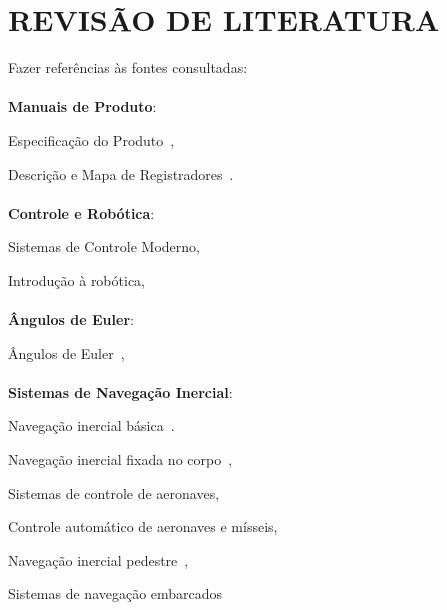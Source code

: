 \chapter{REVISÃO DE LITERATURA}\label{chap:fundamentacaoTeorica}

Fazer referências às fontes consultadas:
\\

\\
\textbf{Manuais de Produto}:

Especificação do Produto~\cite{mpu6050ps},

Descrição e Mapa de Registradores~\cite{mpu6050rm}.
\\

\\
\textbf{Controle e Robótica}:

Sistemas de Controle Moderno\cite{Ogata2010},

Introdução à robótica\cite{Craig2014},
\\

\\
\textbf{Ângulos de Euler}:

Ângulos de Euler~\cite{Henderson1997},
\\

\\
\textbf{Sistemas de Navegação Inercial}:

Navegação inercial básica~\cite{Stovall1997}.

Navegação inercial fixada no corpo~\cite{Weston2004},

Sistemas de controle de aeronaves\cite{Stevens2016},

Controle automático de aeronaves e mísseis\cite{Blakelock1991},

Navegação inercial pedestre~\cite{Wang2021},

Sistemas de navegação embarcados~\cite{Haoran2019}
